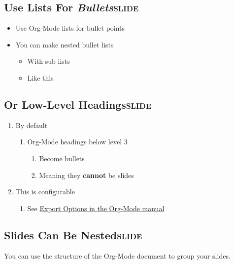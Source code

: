 \documentclass[11pt]{article}
\begin{document}
\subsection{Use \textbf{Lists} For \textit{Bullets}\hfill{}\textsc{slide}}
\label{sec:orgheadline49}

\begin{itemize}
\item Use Org-Mode lists for bullet points
\item You can make nested bullet lists
\begin{itemize}
\item With sub-lists
\item Like this
\end{itemize}
\end{itemize}

\subsection{Or Low-Level Headings\hfill{}\textsc{slide}}
\label{sec:orgheadline56}

\begin{enumerate}
\item By default
\label{sec:orgheadline53}
\begin{enumerate}
\item Org-Mode headings below level 3
\label{sec:orgheadline52}
\begin{enumerate}
\item Become bullets
\label{sec:orgheadline50}
\item Meaning they \textbf{cannot} be slides
\label{sec:orgheadline51}
\end{enumerate}
\end{enumerate}
\item This is configurable
\label{sec:orgheadline55}
\begin{enumerate}
\item See \href{http://orgmode.org/manual/Export-options.html}{Export Options in the Org-Mode manual}
\label{sec:orgheadline54}
\end{enumerate}
\end{enumerate}

\subsection{Slides Can Be Nested\hfill{}\textsc{slide}}
\label{sec:orgheadline58}

You can use the structure of the Org-Mode document to group your slides.
\end{document}
